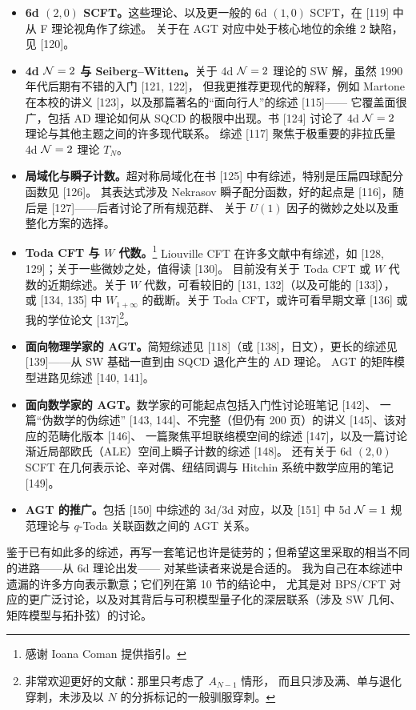 \begin{itemize}[leftmargin=1.6em,itemsep=2pt]
\item \textbf{6d $(2,0)$ SCFT。}这些理论、以及更一般的 6d $(1,0)$ SCFT，在 [119] 中从 F 理论视角作了综述。
      关于在 AGT 对应中处于核心地位的余维 2 缺陷，见 [120]。
\item \textbf{4d $\mathcal{N}=2$ 与 Seiberg--Witten。}关于 4d $\mathcal{N}=2$ 理论的 SW 解，虽然 1990 年代后期有不错的入门 [121, 122]，
      但我更推荐更现代的解释，例如 Martone 在本校的讲义 [123]，以及那篇著名的“面向行人”的综述 [115]------
      它覆盖面很广，包括 AD 理论如何从 SQCD 的极限中出现。书 [124] 讨论了 4d $\mathcal{N}=2$ 理论与其他主题之间的许多现代联系。
      综述 [117] 聚焦于极重要的非拉氏量 4d $\mathcal{N}=2$ 理论 $T_N$。
\item \textbf{局域化与瞬子计数。}超对称局域化在书 [125] 中有综述，特别是压扁四球配分函数见 [126]。
      其表达式涉及 Nekrasov 瞬子配分函数，好的起点是 [116]，随后是 [127]------后者讨论了所有规范群、
      关于 $U(1)$ 因子的微妙之处以及重整化方案的选择。
\item \textbf{Toda CFT 与 $W$ 代数。}\footnote{感谢 Ioana Coman 提供指引。}
      Liouville CFT 在许多文献中有综述，如 [128, 129]；关于一些微妙之处，值得读 [130]。
      目前没有关于 Toda CFT 或 $W$ 代数的近期综述。关于 $W$ 代数，可看较旧的 [131, 132]（以及可能的 [133]），
      或 [134, 135] 中 $W_{1+\infty}$ 的截断。关于 Toda CFT，或许可看早期文章 [136] 或我的学位论文 [137]\footnote{非常欢迎更好的文献：那里只考虑了 $A_{N-1}$ 情形，
      而且只涉及满、单与退化穿刺，未涉及以 $N$ 的分拆标记的一般驯服穿刺。}。
\item \textbf{面向物理学家的 AGT。}简短综述见 [118]（或 [138]，日文），更长的综述见 [139]------从 SW 基础一直到由 SQCD 退化产生的 AD 理论。
      AGT 的矩阵模型进路见综述 [140, 141]。
\item \textbf{面向数学家的 AGT。}数学家的可能起点包括入门性讨论班笔记 [142]、
      一篇“伪数学的伪综述” [143, 144]、不完整（但仍有 200 页）的讲义 [145]、该对应的范畴化版本 [146]、
      一篇聚焦平坦联络模空间的综述 [147]，以及一篇讨论渐近局部欧氏（ALE）空间上瞬子计数的综述 [148]。
      还有关于 6d $(2,0)$ SCFT 在几何表示论、辛对偶、纽结同调与 Hitchin 系统中数学应用的笔记 [149]。
\item \textbf{AGT 的推广。}包括 [150] 中综述的 3d/3d 对应，以及 [151] 中 5d $\mathcal{N}=1$ 规范理论与 $q$-Toda 关联函数之间的 AGT 关系。
\end{itemize}

鉴于已有如此多的综述，再写一套笔记也许是徒劳的；但希望这里采取的相当不同的进路------从 6d 理论出发------
对某些读者来说是合适的。
我为自己在本综述中遗漏的许多方向表示歉意；它们列在第 10 节的结论中，
尤其是对 BPS/CFT 对应的更广泛讨论，以及对其背后与可积模型量子化的深层联系（涉及 SW 几何、矩阵模型与拓扑弦）的讨论。
